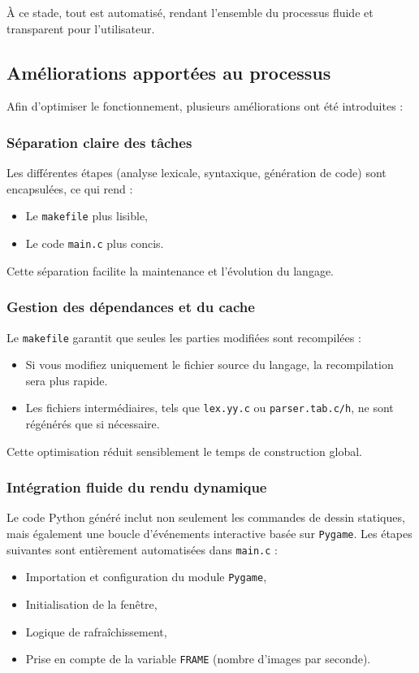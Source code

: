 \documentclass[12pt,a4paper]{article}
\begin{document}
À ce stade, tout est automatisé, rendant l’ensemble du processus fluide et transparent pour l’utilisateur.

\subsection{Améliorations apportées au processus}

Afin d’optimiser le fonctionnement, plusieurs améliorations ont été introduites :

\subsubsection{Séparation claire des tâches}
Les différentes étapes (analyse lexicale, syntaxique, génération de code) sont encapsulées, ce qui rend :
\begin{itemize}
    \item Le \texttt{makefile} plus lisible,
    \item Le code \texttt{main.c} plus concis.
\end{itemize}

Cette séparation facilite la maintenance et l’évolution du langage.

\subsubsection{Gestion des dépendances et du cache}
Le \texttt{makefile} garantit que seules les parties modifiées sont recompilées :
\begin{itemize}
    \item Si vous modifiez uniquement le fichier source du langage, la recompilation sera plus rapide.
    \item Les fichiers intermédiaires, tels que \texttt{lex.yy.c} ou \texttt{parser.tab.c/h}, ne sont régénérés que si nécessaire.
\end{itemize}

Cette optimisation réduit sensiblement le temps de construction global.

\subsubsection{Intégration fluide du rendu dynamique}
Le code Python généré inclut non seulement les commandes de dessin statiques, mais également une boucle d’événements interactive basée sur \texttt{Pygame}. Les étapes suivantes sont entièrement automatisées dans \texttt{main.c} :
\begin{itemize}
    \item Importation et configuration du module \texttt{Pygame},
    \item Initialisation de la fenêtre,
    \item Logique de rafraîchissement,
    \item Prise en compte de la variable \texttt{FRAME} (nombre d’images par seconde).
\end{itemize}
\end{document}
